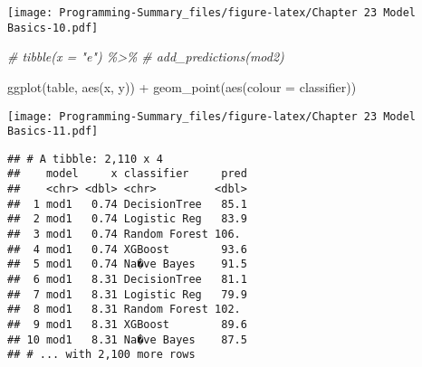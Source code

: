 \documentclass[
]{article}
\newenvironment{Shaded}{\begin{snugshade}}{\end{snugshade}}
\newcommand{\AttributeTok}[1]{\textcolor[rgb]{0.77,0.63,0.00}{#1}}
\newcommand{\CommentTok}[1]{\textcolor[rgb]{0.56,0.35,0.01}{\textit{#1}}}
\newcommand{\FunctionTok}[1]{\textcolor[rgb]{0.00,0.00,0.00}{#1}}
\newcommand{\NormalTok}[1]{#1}
\newcommand{\OtherTok}[1]{\textcolor[rgb]{0.56,0.35,0.01}{#1}}
\newcommand{\SpecialCharTok}[1]{\textcolor[rgb]{0.00,0.00,0.00}{#1}}
\begin{document}
\texttt{[image: Programming-Summary\_files/figure-latex/Chapter 23 Model Basics-10.pdf]}

\begin{Shaded}
\begin{Highlighting}[]
\CommentTok{\# tibble(x = "e") \%\textgreater{}\% }
\CommentTok{\#   add\_predictions(mod2)}

\FunctionTok{ggplot}\NormalTok{(table, }\FunctionTok{aes}\NormalTok{(x, y)) }\SpecialCharTok{+} 
  \FunctionTok{geom\_point}\NormalTok{(}\FunctionTok{aes}\NormalTok{(}\AttributeTok{colour =}\NormalTok{ classifier))}
\end{Highlighting}
\end{Shaded}

\texttt{[image: Programming-Summary\_files/figure-latex/Chapter 23 Model Basics-11.pdf]}

\begin{Shaded}
\end{Shaded}

\begin{verbatim}
## # A tibble: 2,110 x 4
##    model     x classifier     pred
##    <chr> <dbl> <chr>         <dbl>
##  1 mod1   0.74 DecisionTree   85.1
##  2 mod1   0.74 Logistic Reg   83.9
##  3 mod1   0.74 Random Forest 106. 
##  4 mod1   0.74 XGBoost        93.6
##  5 mod1   0.74 Na�ve Bayes    91.5
##  6 mod1   8.31 DecisionTree   81.1
##  7 mod1   8.31 Logistic Reg   79.9
##  8 mod1   8.31 Random Forest 102. 
##  9 mod1   8.31 XGBoost        89.6
## 10 mod1   8.31 Na�ve Bayes    87.5
## # ... with 2,100 more rows
\end{verbatim}
\end{document}
